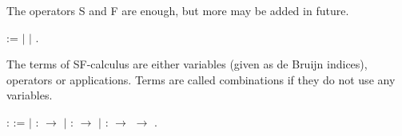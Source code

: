\documentclass[12pt]{report}
\begin{document}

\begin{coqdoccode}
\coqdocemptyline
\coqdocemptyline
\end{coqdoccode}
The operators S and F are enough, but more may be added in future. \begin{coqdoccode}
\coqdocemptyline
\coqdocnoindent
{}  := \ensuremath{|}  \ensuremath{|}  .\coqdoceol
\coqdocemptyline
\end{coqdoccode}
The terms of SF-calculus are either variables (given as de Bruijn indices), operators or applications. 
Terms are called combinations if they do not use any variables. \begin{coqdoccode}
\coqdocemptyline
\coqdocnoindent
{} :   :=\coqdoceol
\coqdocindent{1.00em}
\ensuremath{|}  :  \ensuremath{\rightarrow}         \coqdoceol
\coqdocindent{1.00em}
\ensuremath{|}   :  \ensuremath{\rightarrow}    \coqdoceol
\coqdocindent{1.00em}
\ensuremath{|}  :  \ensuremath{\rightarrow}  \ensuremath{\rightarrow}    \coqdoceol
\coqdocnoindent
.\coqdoceol
\coqdocemptyline
\end{coqdoccode}
\end{document}
